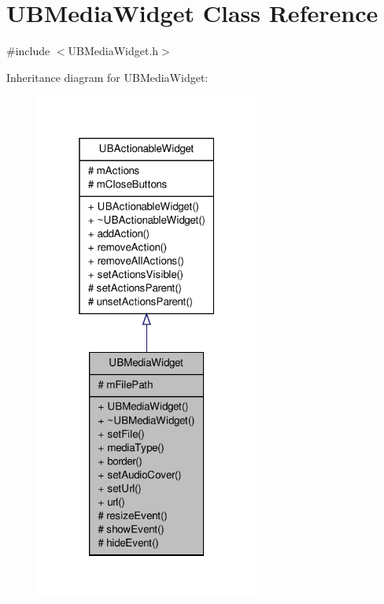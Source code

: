 \hypertarget{class_u_b_media_widget}{\section{U\-B\-Media\-Widget Class Reference}
\label{df/da6/class_u_b_media_widget}
}


{\ttfamily \#include $<$U\-B\-Media\-Widget.\-h$>$}



Inheritance diagram for U\-B\-Media\-Widget\-:
\nopagebreak
\begin{figure}[H]
\begin{center}
\leavevmode
\includegraphics[width=208pt]{d1/d8d/class_u_b_media_widget__inherit__graph}
\end{center}
\end{figure}


